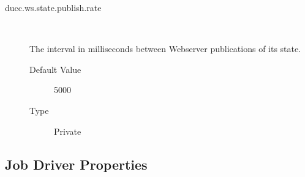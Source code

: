 \begin{description}
      \item[ducc.ws.state.publish.rate] \hfill \\
          \label{itm:props-ws.state.publish.rate}

        The interval in milliseconds between Webserver publications of its state. 
        \begin{description}
          \item[Default Value] 5000
          \item[Type] Private 
        \end{description}

      \end{description}  
            
    
\subsection{Job Driver Properties}
